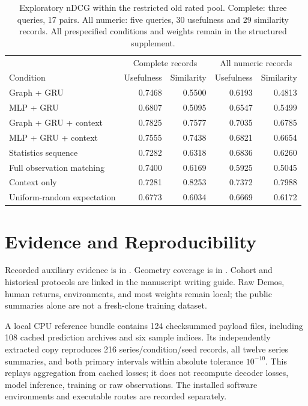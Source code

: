 \begin{table}[t]
\caption{Exploratory nDCG within the restricted old rated pool. Complete: three queries, 17 pairs. All numeric: five queries, 30 usefulness and 29 similarity records. All prespecified conditions and weights remain in the structured supplement.}
\label{tab:oldpool}
\centering\small
\begin{tabular}{lrrrr}
\toprule
 & \multicolumn{2}{c}{Complete records} & \multicolumn{2}{c}{All numeric records}\\
Condition & Usefulness & Similarity & Usefulness & Similarity\\
\midrule
Graph + GRU & 0.7468 & 0.5500 & 0.6193 & 0.4813 \\ %
MLP + GRU & 0.6807 & 0.5095 & 0.6547 & 0.5499 \\ %
Graph + GRU + context & 0.7825 & 0.7577 & 0.7035 & 0.6785 \\ %
MLP + GRU + context & 0.7555 & 0.7438 & 0.6821 & 0.6654 \\ %
Statistics sequence & 0.7282 & 0.6318 & 0.6836 & 0.6260 \\ %
Full observation matching & 0.7400 & 0.6169 & 0.5925 & 0.5045 \\ %
Context only & 0.7281 & 0.8253 & 0.7372 & 0.7988 \\ %
Uniform-random expectation & 0.6773 & 0.6034 & 0.6669 & 0.6172 \\ %
\bottomrule
\end{tabular}
\end{table}
\section{Evidence and Reproducibility}
Recorded auxiliary evidence is in
.
Geometry coverage is in
.
Cohort and historical protocols are linked in the manuscript writing guide. Raw Demos, human returns, environments, and most weights remain local; the public summaries alone are not a fresh-clone training dataset.

A local CPU reference bundle contains 124 checksummed payload files, including 108 cached prediction archives and six sample indices. Its independently extracted copy reproduces 216 series/condition/seed records, all twelve series summaries, and both primary intervals within absolute tolerance $10^{-10}$. This replays aggregation from cached losses; it does not recompute decoder losses, model inference, training or raw observations. The installed software environments and executable routes are recorded separately. %

